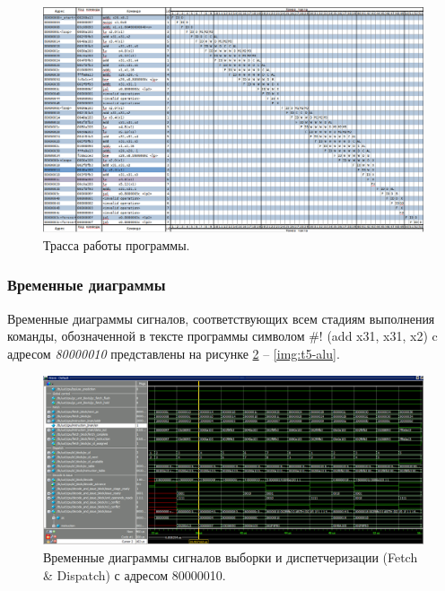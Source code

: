 \begin{figure}[h]
	\centering
	\includegraphics[height=0.4\textheight]{img/t5-trasa-01}
	\caption{Трасса работы программы.}
	\label{img:t5-trasa-01}
\end{figure}

\clearpage

\subsubsection*{Временные диаграммы}
Временные диаграммы сигналов, соответствующих всем стадиям выполнения команды, обозначенной в тексте программы символом \#! (add x31, x31, x2) c адресом \textit{80000010} представлены на рисунке \ref{img:t5-fetch} -- \ref{img:t5-alu}.

\begin{figure}[h]
	\centering
	\includegraphics[height=0.3\textheight]{img/t5-fetch}
	\caption{Временные диаграммы сигналов выборки и диспетчеризации (Fetch \& Dispatch) с адресом 80000010.}
	\label{img:t5-fetch}
\end{figure}

